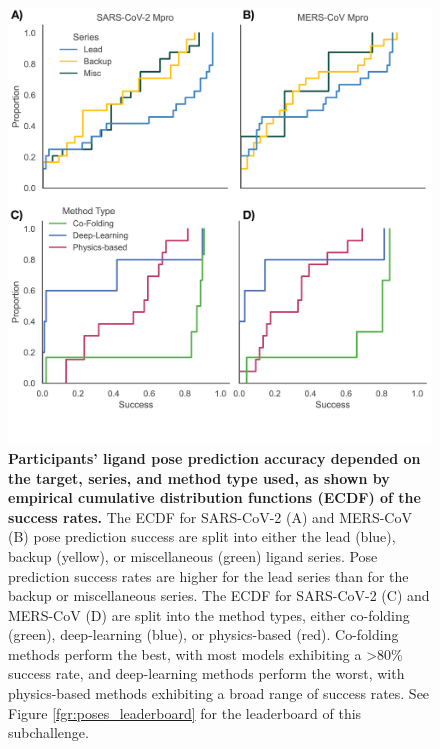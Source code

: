 \documentclass[journal=jcim,manuscript=article]{achemso}
\begin{document}
\begin{figure}
    \includegraphics[scale=1
    ]{fig7_poses_success_CDFs/Figure.png}
  \caption{\textbf{Participants' ligand pose prediction accuracy depended on the target, series, and method type used, as shown by empirical cumulative distribution functions (ECDF) of the success rates.} The ECDF for SARS-CoV-2 (A) and MERS-CoV (B) pose prediction success are  split into either the lead (blue), backup (yellow), or miscellaneous (green) ligand series. Pose prediction success rates are higher for the lead series than for the backup or miscellaneous series. The ECDF for SARS-CoV-2 (C) and MERS-CoV (D) are  split into the method types, either co-folding (green), deep-learning (blue), or physics-based (red). Co-folding methods perform the best, with most models exhibiting a \textgreater 80\% success rate, and deep-learning methods perform the worst, with physics-based methods exhibiting a broad range of success rates. See Figure \ref{fgr:poses_leaderboard} for the leaderboard of this subchallenge.}
  \label{fgr:poses_by_series_and_method}
\end{figure}
\end{document}
